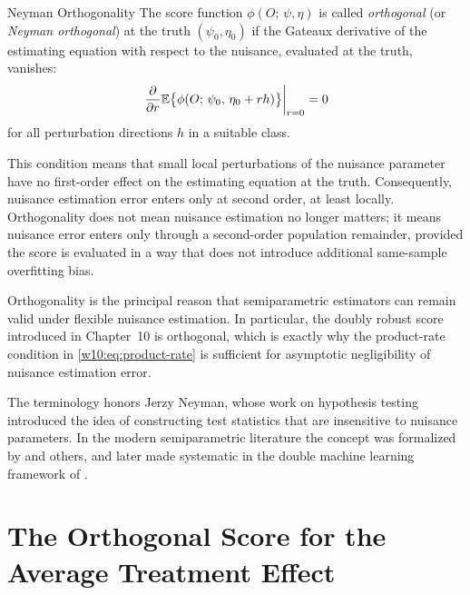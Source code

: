 \documentclass[master.tex]{subfiles}
\begin{document}
\begin{defn}{Neyman Orthogonality}
\label{w11:defn:orthogonal}
The score function $\phi(O;\,\psi,\eta)$ is called \emph{orthogonal}
(or \emph{Neyman orthogonal}) at the truth $(\psi_0, \eta_0)$ if the
Gateaux derivative of the estimating equation with respect to the
nuisance, evaluated at the truth, vanishes:
\[
  \left.
    \frac{\partial}{\partial r}
    \mathbb{E}\bigl\{\phi(O;\,\psi_0,\,\eta_0 + r h)\bigr\}
  \right|_{r=0}
  = 0
\]
for all perturbation directions $h$ in a suitable class.
\end{defn}

This condition means that small local perturbations of the nuisance
parameter have no first-order effect on the estimating equation at the
truth.  Consequently, nuisance estimation error enters only at second
order, at least locally.  Orthogonality does not mean nuisance
estimation no longer matters; it means nuisance error enters only
through a second-order population remainder, provided the score is
evaluated in a way that does not introduce additional same-sample
overfitting bias.

Orthogonality is the principal reason that semiparametric estimators
can remain valid under flexible nuisance estimation.  In particular,
the doubly robust score introduced in Chapter~10 is orthogonal, which
is exactly why the product-rate condition in
\eqref{w10:eq:product-rate} is sufficient for asymptotic negligibility
of nuisance estimation error.

\begin{remark}
\label{w11:rem:neyman-history}
The terminology honors Jerzy Neyman, whose work on hypothesis testing
introduced the idea of constructing test statistics that are insensitive
to nuisance parameters.  In the modern semiparametric literature the
concept was formalized by \citet{robins1994estimation} and others,
and later made systematic in the double machine learning framework
of \citet{chernozhukov2018double}.
\end{remark}


\section{The Orthogonal Score for the Average Treatment Effect}
\label{w11:sec:ate-score}
\end{document}
